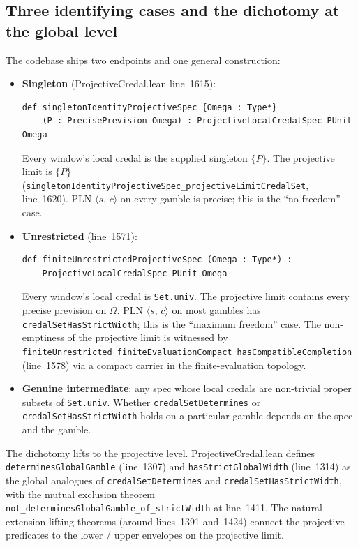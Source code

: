 \documentclass[]{article}
\newcommand{\lid}[1]{{\ttfamily\nolinkurl{#1}}}
\newcommand{\STV}[2]{\langle #1,\, #2 \rangle}
\begin{document}
\subsection{Three identifying cases and the dichotomy at the global level}

The codebase ships two endpoints and one general construction:
\begin{itemize}
\item \textbf{Singleton} (ProjectiveCredal.lean line~1615):
\begin{lstlisting}
def singletonIdentityProjectiveSpec {Omega : Type*}
    (P : PrecisePrevision Omega) : ProjectiveLocalCredalSpec PUnit Omega
\end{lstlisting}
Every window's local credal is the supplied singleton $\{P\}$. The
projective limit is $\{P\}$
(\lid{singletonIdentityProjectiveSpec\_projectiveLimitCredalSet},
line~1620). PLN $\STV{s}{c}$ on every gamble is precise; this is the
``no freedom'' case.

\item \textbf{Unrestricted} (line~1571):
\begin{lstlisting}
def finiteUnrestrictedProjectiveSpec (Omega : Type*) :
    ProjectiveLocalCredalSpec PUnit Omega
\end{lstlisting}
Every window's local credal is \lid{Set.univ}. The projective limit
contains every precise prevision on $\Omega$. PLN $\STV{s}{c}$ on most
gambles has \lid{credalSetHasStrictWidth}; this is the ``maximum freedom''
case. The non-emptiness of the projective limit is witnessed by
\lid{finiteUnrestricted\_finiteEvaluationCompact\_hasCompatibleCompletion}
(line~1578) via a compact carrier in the finite-evaluation topology.

\item \textbf{Genuine intermediate}: any spec whose local credals are
non-trivial proper subsets of \lid{Set.univ}. Whether
\lid{credalSetDetermines} or \lid{credalSetHasStrictWidth} holds on a
particular gamble depends on the spec and the gamble.
\end{itemize}

The dichotomy lifts to the projective level. ProjectiveCredal.lean defines
\lid{determinesGlobalGamble} (line~1307) and \lid{hasStrictGlobalWidth}
(line~1314) as the global analogues of \lid{credalSetDetermines} and
\lid{credalSetHasStrictWidth}, with the mutual exclusion theorem
\lid{not\_determinesGlobalGamble\_of\_strictWidth} at line~1411. The
natural-extension lifting theorems (around lines~1391 and~1424) connect
the projective predicates to the lower / upper envelopes on the projective
limit.
\end{document}
